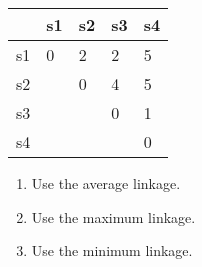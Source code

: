 \begin{table}[H]
\centering
\begin{tabular}{|l|l|l|l|l|}
\hline
   & s1 & s2 & s3 & s4 \\ \hline
s1 & 0  & 2  & 2  & 5  \\ \hline
s2 &    & 0  & 4  & 5  \\ \hline
s3 &    &    & 0  & 1  \\ \hline
s4 &    &    &    & 0  \\ \hline
\end{tabular}
\end{table}

\begin{enumerate}
\item Use the average linkage.
\bigskip 

\item Use the maximum linkage.
\bigskip 

\item Use the minimum linkage.
\end{enumerate}

\bigskip 

%
